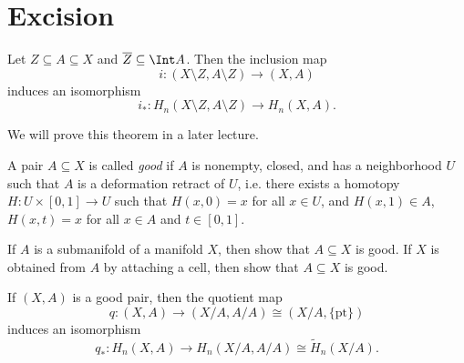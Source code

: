 \section{Excision}

\begin{theorem}[Excision]\label{thm:excision}
  Let $Z \subseteq A \subseteq X$ and
  $\overline{Z} \subseteq \Int A$. Then the
  inclusion map
  \[
    i : (X \setminus Z, A \setminus Z) \to (X, A)
  \]
  induces an isomorphism
  \[
    i_* : H_n(X \setminus Z, A \setminus Z) \to H_n(X, A).
  \]
\end{theorem}

\begin{remark}
  We will prove this theorem in a later lecture.
\end{remark}

\begin{definition}
  A pair $A \subseteq X$ is called
  \emph{good} if $A$ is nonempty, closed, and has
  a neighborhood $U$ such that
  $A$ is a deformation retract of $U$, i.e.
  there exists a homotopy $H : U \times [0, 1] \to U$
  such that $H(x, 0) = x$ for all $x \in U$, and
  $H(x, 1) \in A$,
  $H(x, t) = x$ for all $x \in A$ and $t \in [0, 1]$.
\end{definition}

\begin{exercise}
  If $A$ is a submanifold of a manifold $X$, then
  show that $A \subseteq X$ is good.
  If $X$ is obtained from $A$ by attaching a cell,
  then show that $A \subseteq X$ is good.
\end{exercise}

\begin{theorem}
  If $(X, A)$ is a good pair, then
  the quotient map
  \[q : (X, A) \to (X/A, A/A) \cong (X / A, \{\mathrm{pt}\})\]
  induces an isomorphism
  \[q_* : H_n(X, A) \to H_n(X/A, A/A) \cong \widetilde{H}_n(X / A).\]
\end{theorem}

